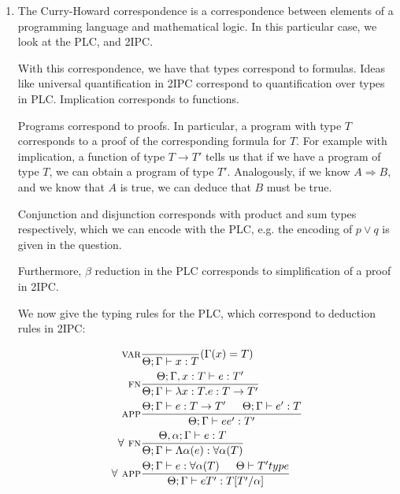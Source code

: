 


\begin{enumerate}[label=(\alph*)]
  \item
    The Curry-Howard correspondence is a correspondence between elements of a programming language and mathematical logic. In this particular case, we look at the PLC, and 2IPC.

    With this correspondence, we have that types correspond to formulas. Ideas like universal quantification in 2IPC correspond to quantification over types in PLC. Implication corresponds to functions.

    Programs correspond to proofs. In particular, a program with type $T$ corresponds to a proof of the corresponding formula for $T$. For example with implication, a function of type $T \rightarrow T'$ tells us that if we have a program of type $T$, we can obtain a program of type $T'$. Analogously, if we know $A \Rightarrow B$, and we know that $A$ is true, we can deduce that $B$ must be true.

    Conjunction and disjunction corresponds with product and sum types respectively, which we can encode with the PLC, e.g. the encoding of $p \vee q$ is given in the question.

    Furthermore, $\beta$ reduction in the PLC corresponds to simplification of a proof in 2IPC.

    We now give the typing rules for the PLC, which correspond to deduction rules in 2IPC:

    \begin{align*}
      \textsc{var}&\frac{}{\Theta;\Gamma \vdash x : T}(\Gamma(x) = T)\\
      \textsc{fn}&\frac{\Theta;\Gamma, x : T \vdash e : T'}{\Theta;\Gamma \vdash \lambda x : T.e : T\rightarrow T'}\\
      \textsc{app}&\frac{\Theta;\Gamma \vdash e : T \rightarrow T' \hspace{15pt} \Theta;\Gamma \vdash e' : T}{\Theta;\Gamma \vdash e e' : T'}\\
      \textsc{$\forall$ fn}&\frac{\Theta, \alpha;\Gamma \vdash e : T}{\Theta;\Gamma \vdash \Lambda \alpha(e) : \forall \alpha (T)}\\
      \textsc{$\forall$ app}&\frac{\Theta;\Gamma \vdash e : \forall \alpha (T) \hspace{15pt} \Theta \vdash T' type}{\Theta;\Gamma \vdash e T' : T[T' / \alpha]}\\
    \end{align*}


\end{enumerate}
